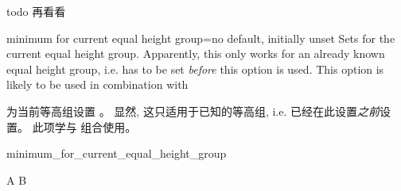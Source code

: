 todo 再看看
\begin{docTcbKey}[][doc new=2016-03-24]{minimum for current equal height group}{=}{no default, initially unset}
Sets  for the current equal height
group. Apparently, this only works for an already known equal height group, i.e.
 has to be set \emph{before} this option is used.
This option is likely to be used in combination with 

为当前等高组设置 。
显然, 这只适用于已知的等高组, i.e.
已经在此设置\emph{之前}设置。
此项学与  组合使用。
\begin{exdispExample}[runs=2]{minimum_for_current_equal_height_group}
\begin{tcbitemize}[raster equal height,colframe=blue!75!black,colback=white,
raster every box/.style={minimum for current equal height group=2cm}]
\tcbitem A
\tcbitem B
\end{tcbitemize}
\end{exdispExample}

\end{docTcbKey}





